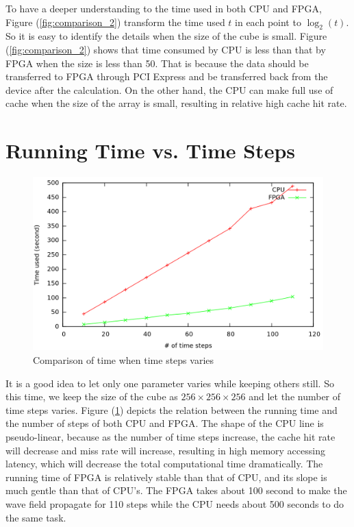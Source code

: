 To have a deeper understanding to the time used in both CPU and FPGA,
Figure (\ref{fig:comparison_2}) transform the time used \( t \) in each
point to \(\log_2\left( t \right) \). So it is easy to identify the details
when the size of the cube is small. Figure (\ref{fig:comparison_2}) shows
that time consumed by CPU is less than that by FPGA when the size is less
than 50. That is because the data should be transferred to FPGA through PCI
Express and be transferred back from the device after the calculation.
On the other hand, the CPU can make full use of cache when the size of the
array is small, resulting in relative high cache hit rate.


\section{Running Time vs.  Time Steps} %

\begin{figure}[h]
  \centering
  \includegraphics[scale=0.32]{img/size256t10to110.png}
  \caption{Comparison of time when time steps varies}
  \label{fig:comparison_3}
\end{figure}

It is a good idea to let only one parameter varies while keeping others
still. So this time, we keep the size of the cube as \( 256 \times 256
\times 256 \) and let the number of time steps varies. Figure
(\ref{fig:comparison_3}) depicts the relation between the running time and
the number of steps of both CPU and FPGA. The shape of the CPU line is
pseudo-linear, because as the number of time steps increase, the cache hit
rate will decrease and miss rate will increase, resulting in high memory
accessing latency, which will decrease the total computational time
dramatically. The running time of FPGA is relatively stable than that of
CPU, and its slope is much gentle than that of CPU's. The FPGA takes about
100 second to make the wave field propagate for 110 steps while the CPU
needs about 500 seconds to do the same task.

